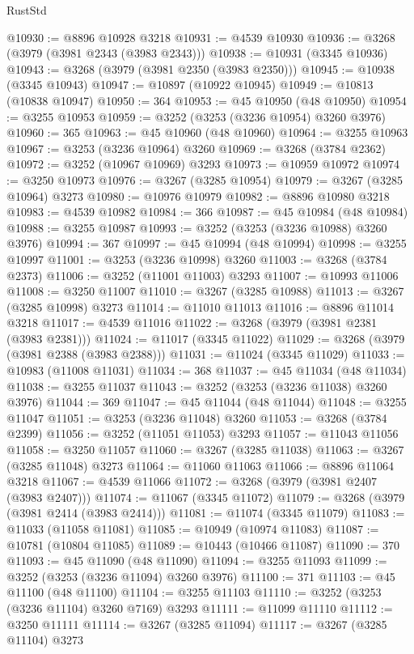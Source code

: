 \begin{lexlean}{RustStd}
\begin{coremodule}
@10930 := @8896 @10928 @3218
@10931 := @4539 @10930
@10936 := @3268 (@3979 (@3981 @2343 (@3983 @2343)))
@10938 := @10931 (@3345 @10936)
@10943 := @3268 (@3979 (@3981 @2350 (@3983 @2350)))
@10945 := @10938 (@3345 @10943)
@10947 := @10897 (@10922 @10945)
@10949 := @10813 (@10838 @10947)
@10950 := 364
@10953 := @45 @10950 (@48 @10950)
@10954 := @3255 @10953
@10959 := @3252 (@3253 (@3236 @10954) @3260 @3976)
@10960 := 365
@10963 := @45 @10960 (@48 @10960)
@10964 := @3255 @10963
@10967 := @3253 (@3236 @10964) @3260
@10969 := @3268 (@3784 @2362)
@10972 := @3252 (@10967 @10969) @3293
@10973 := @10959 @10972
@10974 := @3250 @10973
@10976 := @3267 (@3285 @10954)
@10979 := @3267 (@3285 @10964) @3273
@10980 := @10976 @10979
@10982 := @8896 @10980 @3218
@10983 := @4539 @10982
@10984 := 366
@10987 := @45 @10984 (@48 @10984)
@10988 := @3255 @10987
@10993 := @3252 (@3253 (@3236 @10988) @3260 @3976)
@10994 := 367
@10997 := @45 @10994 (@48 @10994)
@10998 := @3255 @10997
@11001 := @3253 (@3236 @10998) @3260
@11003 := @3268 (@3784 @2373)
@11006 := @3252 (@11001 @11003) @3293
@11007 := @10993 @11006
@11008 := @3250 @11007
@11010 := @3267 (@3285 @10988)
@11013 := @3267 (@3285 @10998) @3273
@11014 := @11010 @11013
@11016 := @8896 @11014 @3218
@11017 := @4539 @11016
@11022 := @3268 (@3979 (@3981 @2381 (@3983 @2381)))
@11024 := @11017 (@3345 @11022)
@11029 := @3268 (@3979 (@3981 @2388 (@3983 @2388)))
@11031 := @11024 (@3345 @11029)
@11033 := @10983 (@11008 @11031)
@11034 := 368
@11037 := @45 @11034 (@48 @11034)
@11038 := @3255 @11037
@11043 := @3252 (@3253 (@3236 @11038) @3260 @3976)
@11044 := 369
@11047 := @45 @11044 (@48 @11044)
@11048 := @3255 @11047
@11051 := @3253 (@3236 @11048) @3260
@11053 := @3268 (@3784 @2399)
@11056 := @3252 (@11051 @11053) @3293
@11057 := @11043 @11056
@11058 := @3250 @11057
@11060 := @3267 (@3285 @11038)
@11063 := @3267 (@3285 @11048) @3273
@11064 := @11060 @11063
@11066 := @8896 @11064 @3218
@11067 := @4539 @11066
@11072 := @3268 (@3979 (@3981 @2407 (@3983 @2407)))
@11074 := @11067 (@3345 @11072)
@11079 := @3268 (@3979 (@3981 @2414 (@3983 @2414)))
@11081 := @11074 (@3345 @11079)
@11083 := @11033 (@11058 @11081)
@11085 := @10949 (@10974 @11083)
@11087 := @10781 (@10804 @11085)
@11089 := @10443 (@10466 @11087)
@11090 := 370
@11093 := @45 @11090 (@48 @11090)
@11094 := @3255 @11093
@11099 := @3252 (@3253 (@3236 @11094) @3260 @3976)
@11100 := 371
@11103 := @45 @11100 (@48 @11100)
@11104 := @3255 @11103
@11110 := @3252 (@3253 (@3236 @11104) @3260 @7169) @3293
@11111 := @11099 @11110
@11112 := @3250 @11111
@11114 := @3267 (@3285 @11094)
@11117 := @3267 (@3285 @11104) @3273

\end{coremodule}
\end{lexlean}
